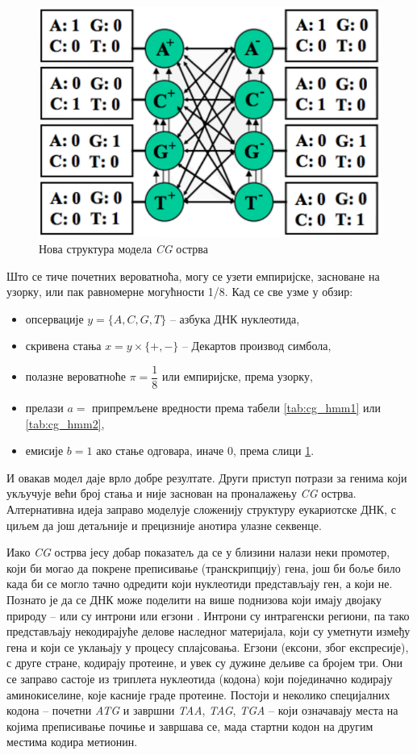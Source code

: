 \documentclass[12pt,oneside]{memoir}
\begin{document}
\begin{CJK}{UTF8}{ipxm}
\begin{figure}[H]
  \centering
  \includegraphics[width=.7\textwidth]{cg_stanja.png}
  \caption{Нова структура модела \textit{CG} острва \cite{kellis2021}}
  \label{fig:cg_stanja}
\end{figure}

Што се тиче почетних вероватноћа, могу се узети емпиријске, засноване на узорку, или пак равномерне могућности 1/8. Кад се све узме у обзир:
\begin{itemize}
  \item опсервације $y = \{A, C, G, T\}$ -- азбука ДНК нуклеотида,
  \item скривена стања $x = y \times \{+, -\}$ -- Декартов производ симбола,
  \item полазне вероватноће $\pi = \dfrac{1}{8}$ или емпиријске, према узорку,
  \item прелази $a =$ припремљене вредности према табели \ref{tab:cg_hmm1} или \ref{tab:cg_hmm2},
  \item емисије $b = 1$ ако стање одговара, иначе $0$, према слици \ref{fig:cg_stanja}.
\end{itemize}

И овакав модел даје врло добре резултате. Други приступ потрази за генима који укључује већи број стања и није заснован на проналажењу \textit{CG} острва. Алтернативна идеја заправо моделује сложенију структуру еукариотске ДНК, с циљем да још детаљније и прецизније анотира улазне секвенце.

Иако \textit{CG} острва јесу добар показатељ да се у близини налази неки промотер, који би могао да покрене преписивање (транскрипцију) гена, још би боље било када би се могло тачно одредити који нуклеотиди представљају ген, а који не. Познато је да се ДНК може поделити на више поднизова који имају двојаку природу -- или су интрони или егзони \cite{knapp2007, yoon2009}. Интрони су интрагенски региони, па тако представљају некодирајуће делове наследног материјала, који су уметнути између гена и који се уклањају у процесу сплајсовања. Егзони (ексони, због експресије), с друге стране, кодирају протеине, и увек су дужине дељиве са бројем три. Они се заправо састоје из триплета нуклеотида (кодона) који појединачно кодирају аминокиселине, које касније граде протеине. Постоји и неколико специјалних кодона -- почетни \textit{ATG} и завршни \textit{TAA}, \textit{TAG}, \textit{TGA} -- који означавају места на којима преписивање почиње и завршава се, мада стартни кодон на другим местима кодира метионин.


\end{CJK}
\end{document}
